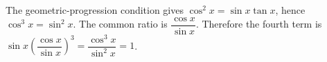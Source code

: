 The geometric-progression condition gives $\cos^2x=\sin x\tan x$, hence $\cos^3x=\sin^2x$. The common ratio is $\dfrac{\cos x}{\sin x}$. Therefore the fourth term is $\sin x (\dfrac{\cos x}{\sin x})^3 = \dfrac{\cos^3 x}{\sin^2 x} = \boxed{1}$.
